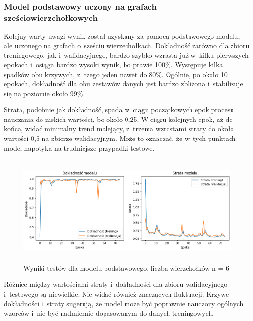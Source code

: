 
\subsubsection{Model podstawowy uczony na grafach sześciowierzchołkowych}

Kolejny warty uwagi wynik został uzyskany za pomocą podstawowego modelu, ale uczonego na grafach o~sześciu wierzechołkach.
Dokładność zarówno dla zbioru treningowego, jak i~walidacyjnego, bardzo szybko wzrasta już w~kilku pierwszych epokach
i~osiąga bardzo wysoki wynik, bo prawie 100\%.
Występuje kilka spadków obu krzywych, z~czego jeden nawet do 80\%.
Ogólnie, po około 10 epokach, dokładność dla obu zestawów danych jest bardzo zbliżona i~stabilizuje się na poziomie około 99\%.

Strata, podobnie jak dokładność, spada w~ciągu początkowych epok procesu nauczania do niskich wartości, bo około 0,25.
W ciągu kolejnych epok, aż do końca, widać minimalny trend malejący, z~trzema wzrostami straty do około wartości 0,5 na zbiorze walidacyjnym.
Może to oznaczać, że w~tych punktach model napotyka na trudniejsze przypadki testowe.

\begin{figure}[ht]
	\centering
	\includegraphics[height=5.5cm]{resources/tests/images/v3/base6_img.png}
	\caption{Wyniki testów dla modelu podstawowego, liczba wierzchołków n = 6}
	\label{Fig:tests-base-3a}
\end{figure}
\FloatBarrier

Różnice między wartościami straty i~dokładności dla zbioru walidacyjnego i~testowego są niewielkie.
Nie widać również znaczących fluktuacji.
Krzywe dokładności i~straty sugerują, że model może być poprawnie nauczony ogólnych wzorców
i~nie być nadmiernie dopasowanym do danych treningowych.

